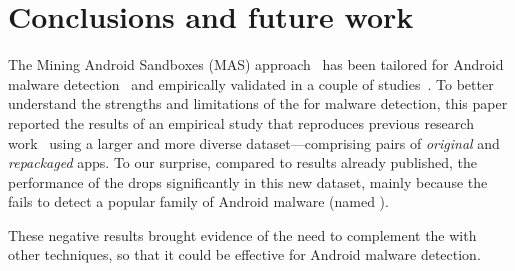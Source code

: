 \section{Conclusions and future work}\label{sec:conclusions}

The Mining Android Sandboxes (MAS) approach~\cite{DBLP:conf/icse/JamrozikZ16}
has been tailored for Android malware detection~\cite{DBLP:conf/wcre/BaoLL18}
and empirically validated in a couple of studies~\cite{DBLP:conf/wcre/BaoLL18,DBLP:conf/iceccs/LeB0GL18,DBLP:journals/jss/CostaMMSSBNR22}.
To better understand the strengths and limitations of the \mas for malware detection,
this paper reported the results of an empirical study that reproduces previous research
work~\cite{DBLP:conf/wcre/BaoLL18,DBLP:journals/jss/CostaMMSSBNR22} using a larger and more
diverse dataset---comprising \apps pairs of \emph{original} and \emph{repackaged} apps.
To our surprise, compared to results already published,
the performance of the \mas drops significantly in this new dataset, mainly
because the \mas fails to detect a popular family of Android malware (named \gps). 

These negative results brought evidence of the need to complement the \mas with other techniques, so that it could be effective for Android malware detection.
